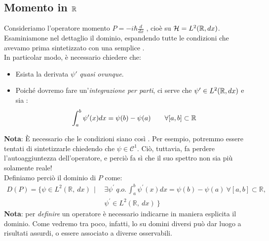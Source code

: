 \documentclass[../../FisicaTeorica.tex]{subfiles}
\begin{document}
\subsection{Momento in $\mathbb{R}$}
Consideriamo l'operatore momento $P=-i\hbar \frac{d}{dx}$ , cioè su $\mathcal{H} = L^2(\bm{\mathbb{R}}, dx)$. Esaminiamone nel dettaglio il dominio, espandendo tutte le condizioni che avevamo prima sintetizzato con una semplice .\\
In particolar modo, è necessario chiedere che:
\begin{itemize}
    \item Esista la derivata $\psi'$ \textit{quasi ovunque}.
    \item Poiché dovremo fare un'\textit{integrazione per parti}, ci serve che $\psi' \in L^2(\mathbb{R}, dx)$ e sia :
    \[
    \int_a^b \psi'(x)dx = \psi(b)-\psi(a) \qquad \forall [a,b] \subset \mathbb{R}
    \]
\end{itemize}
\textbf{Nota}: È necessario che le condizioni siano così . Per esempio, potremmo essere tentati di sintetizzarle chiedendo che $\psi \in \mathcal C^1$. Ciò, tuttavia, fa perdere l'autoaggiuntezza dell'operatore, e perciò fa sì che il suo spettro non sia più solamente reale!\\
Definiamo perciò il dominio di $P$ come:
\begin{align*}
D\left(P\right)= \big\{\psi\in L^2\left(\mathbb{R},\ dx\right)\ \ |\ \ 
&\exists\psi^\prime\ q.o.\, \int_{a}^{b}{\psi^\prime\left(x\right)dx}=\psi\left(b\right)-\psi\left(a\right)\ \forall\left[a,b\right]\subset\mathbb{R},\\
&\psi^\prime\in L^2(\mathbb{R},\ dx)\ \big\}
\end{align*}
\textbf{Nota}: per \textit{definire} un operatore è necessario indicarne in maniera esplicita il dominio. Come vedremo tra poco, infatti, lo  su domini diversi può dar luogo a risultati assurdi, o essere associato a diverse osservabili.\\
\end{document}
